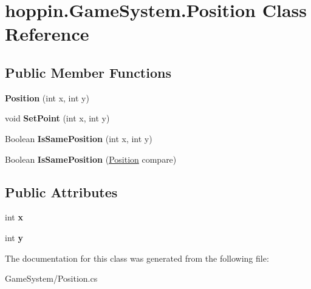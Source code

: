 \hypertarget{classhoppin_1_1_game_system_1_1_position}{}\section{hoppin.\+Game\+System.\+Position Class Reference}
\label{classhoppin_1_1_game_system_1_1_position}
\subsection*{Public Member Functions}
\begin{DoxyCompactItemize}
\item 
{\bfseries Position} (int x, int y)\hypertarget{classhoppin_1_1_game_system_1_1_position_a2814b150aff5ef82a5594f78a750e076}{}\label{classhoppin_1_1_game_system_1_1_position_a2814b150aff5ef82a5594f78a750e076}

\item 
void {\bfseries Set\+Point} (int x, int y)\hypertarget{classhoppin_1_1_game_system_1_1_position_acc5785c6b1cad4cf37c11a04112f12b3}{}\label{classhoppin_1_1_game_system_1_1_position_acc5785c6b1cad4cf37c11a04112f12b3}

\item 
Boolean {\bfseries Is\+Same\+Position} (int x, int y)\hypertarget{classhoppin_1_1_game_system_1_1_position_a7da2cb5793df23ae806e09d90790ec88}{}\label{classhoppin_1_1_game_system_1_1_position_a7da2cb5793df23ae806e09d90790ec88}

\item 
Boolean {\bfseries Is\+Same\+Position} (\hyperlink{classhoppin_1_1_game_system_1_1_position}{Position} compare)\hypertarget{classhoppin_1_1_game_system_1_1_position_a5a305daf18840804f5c42449c9fb6298}{}\label{classhoppin_1_1_game_system_1_1_position_a5a305daf18840804f5c42449c9fb6298}

\end{DoxyCompactItemize}
\subsection*{Public Attributes}
\begin{DoxyCompactItemize}
\item 
int {\bfseries x}\hypertarget{classhoppin_1_1_game_system_1_1_position_a6cba15765f2715409ff006316f52313e}{}\label{classhoppin_1_1_game_system_1_1_position_a6cba15765f2715409ff006316f52313e}

\item 
int {\bfseries y}\hypertarget{classhoppin_1_1_game_system_1_1_position_ad456a36294bbe1f297294d3d1ddf051f}{}\label{classhoppin_1_1_game_system_1_1_position_ad456a36294bbe1f297294d3d1ddf051f}

\end{DoxyCompactItemize}


The documentation for this class was generated from the following file\+:\begin{DoxyCompactItemize}
\item 
Game\+System/Position.\+cs\end{DoxyCompactItemize}
